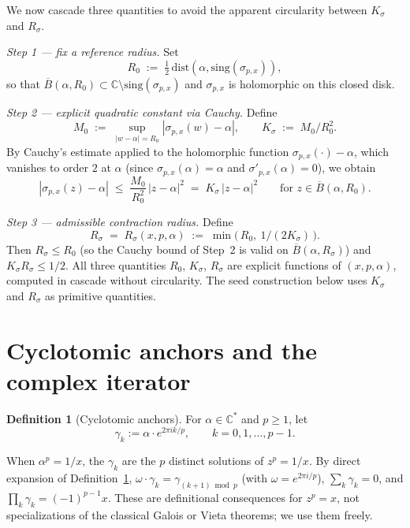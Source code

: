 \documentclass[11pt,a4paper]{article}
\theoremstyle{definition}
\newtheorem{definition}{Definition}[section]
\begin{document}
We now cascade three quantities to avoid the apparent circularity between $K_\sigma$ and $R_\sigma$.

\medskip
\noindent\emph{Step 1 --- fix a reference radius.} Set
\[
  R_0 \;:=\; \tfrac12\,\mathrm{dist}(\alpha, \mathrm{sing}(\sigma_{p,x})),
\]
so that $\overline{B}(\alpha, R_0) \subset \mathbb{C} \setminus \mathrm{sing}(\sigma_{p,x})$ and $\sigma_{p,x}$ is holomorphic on this closed disk.

\noindent\emph{Step 2 --- explicit quadratic constant via Cauchy.} Define
\[
  M_0 \;:=\; \sup_{|w - \alpha| = R_0} |\sigma_{p,x}(w) - \alpha|,
  \qquad
  K_\sigma \;:=\; M_0 / R_0^2.
\]
By Cauchy's estimate applied to the holomorphic function $\sigma_{p,x}(\cdot) - \alpha$, which vanishes to order $2$ at $\alpha$ (since $\sigma_{p,x}(\alpha) = \alpha$ and $\sigma'_{p,x}(\alpha) = 0$), we obtain
\[
  |\sigma_{p,x}(z) - \alpha|
  \;\leq\; \frac{M_0}{R_0^2}\,|z - \alpha|^2
  \;=\; K_\sigma\,|z - \alpha|^2
  \qquad \text{for } z \in \overline{B}(\alpha, R_0).
\]

\noindent\emph{Step 3 --- admissible contraction radius.} Define
\[
  R_\sigma \;=\; R_\sigma(x, p, \alpha) \;:=\; \min\!\bigl(\,R_0,\ 1/(2K_\sigma)\,\bigr).
\]
Then $R_\sigma \leq R_0$ (so the Cauchy bound of Step~2 is valid on $\overline{B}(\alpha, R_\sigma)$) and $K_\sigma R_\sigma \leq 1/2$. All three quantities $R_0$, $K_\sigma$, $R_\sigma$ are explicit functions of $(x, p, \alpha)$, computed in cascade without circularity. The seed construction below uses $K_\sigma$ and $R_\sigma$ as primitive quantities.

\section{Cyclotomic anchors and the complex iterator}
\label{sec:cyclotomic}

\begin{definition}[Cyclotomic anchors]\label{def:cyc-anchor}
For $\alpha \in \mathbb{C}^\ast$ and $p \geq 1$, let
\[
  \gamma_k := \alpha \cdot e^{2\pi i k / p}, \qquad k = 0, 1, \dots, p-1.
\]
\end{definition}

When $\alpha^p = 1/x$, the $\gamma_k$ are the $p$ distinct solutions of $z^p = 1/x$. By direct expansion of Definition~\ref{def:cyc-anchor}, $\omega \cdot \gamma_k = \gamma_{(k+1)\bmod p}$ (with $\omega = e^{2\pi i/p}$), $\sum_k \gamma_k = 0$, and $\prod_k \gamma_k = (-1)^{p-1} x$. These are definitional consequences for $z^p = x$, not specializations of the classical Galois or Vieta theorems; we use them freely.
\end{document}
